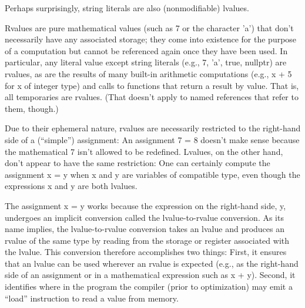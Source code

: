 Perhaps surprisingly, string literals are also (nonmodifiable) lvalues. 

Rvalues are pure mathematical values (such as 7 or the character ’a’) that don’t necessarily have any associated storage; they come into existence for the purpose of a computation but cannot be referenced again once they have been used. In particular, any literal value except string literals (e.g., 7, ’a’, true, nullptr) are rvalues, as are the results of many built-in arithmetic computations (e.g., x + 5 for x of integer type) and calls to functions that return a result by value. That is, all temporaries are rvalues. (That doesn’t apply to named references that refer to them, though.)


Due to their ephemeral nature, rvalues are necessarily restricted to the right-hand side of a (“simple”) assignment: An assignment 7 = 8 doesn’t make sense because the mathematical 7 isn’t allowed to be redefined. Lvalues, on the other hand, don’t appear to have the same restriction: One can certainly compute the assignment x = y when x and y are variables of compatible type, even though the expressions x and y are both lvalues.

The assignment x = y works because the expression on the right-hand side, y, undergoes an implicit conversion called the lvalue-to-rvalue conversion. As its name implies, the lvalue-to-rvalue conversion takes an lvalue and produces an rvalue of the same type by reading from the storage or register associated with the lvalue. This conversion therefore accomplishes two things: First, it ensures that an lvalue can be used wherever an rvalue is expected (e.g., as the right-hand side of an assignment or in a mathematical expression such as x + y). Second, it identifies where in the program the compiler (prior to optimization) may emit a “load” instruction to read a value from memory.


















